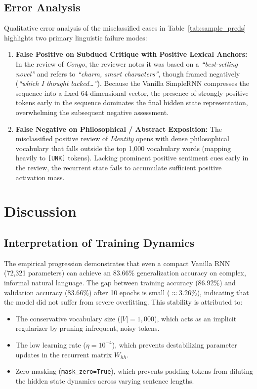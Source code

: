 \documentclass[11pt,a4paper]{article}
\begin{document}
\subsection{Error Analysis}
Qualitative error analysis of the misclassified cases in Table~\ref{tab:sample_preds} highlights two primary linguistic failure modes:
\begin{enumerate}
    \item \textbf{False Positive on Subdued Critique with Positive Lexical Anchors:} In the review of \textit{Congo}, the reviewer notes it was based on a \textit{``best-selling novel''} and refers to \textit{``charm, smart characters''}, though framed negatively (\textit{``which I thought lacked\dots''}). Because the Vanilla SimpleRNN compresses the sequence into a fixed 64-dimensional vector, the presence of strongly positive tokens early in the sequence dominates the final hidden state representation, overwhelming the subsequent negative assessment.
    \item \textbf{False Negative on Philosophical / Abstract Exposition:} The misclassified positive review of \textit{Identity} opens with dense philosophical vocabulary that falls outside the top 1,000 vocabulary words (mapping heavily to \texttt{[UNK]} tokens). Lacking prominent positive sentiment cues early in the review, the recurrent state fails to accumulate sufficient positive activation mass.
\end{enumerate}

\section{Discussion}
\label{sec:discussion}

\subsection{Interpretation of Training Dynamics}
The empirical progression demonstrates that even a compact Vanilla RNN (72,321 parameters) can achieve an 83.66\% generalization accuracy on complex, informal natural language. The gap between training accuracy (86.92\%) and validation accuracy (83.66\%) after 10 epochs is small ($\approx 3.26\%$), indicating that the model did not suffer from severe overfitting. This stability is attributed to:
\begin{itemize}
    \item The conservative vocabulary size ($|V| = 1,000$), which acts as an implicit regularizer by pruning infrequent, noisy tokens.
    \item The low learning rate ($\eta = 10^{-4}$), which prevents destabilizing parameter updates in the recurrent matrix $W_{hh}$.
    \item Zero-masking (\texttt{mask\_zero=True}), which prevents padding tokens from diluting the hidden state dynamics across varying sentence lengths.
\end{itemize}
\end{document}

